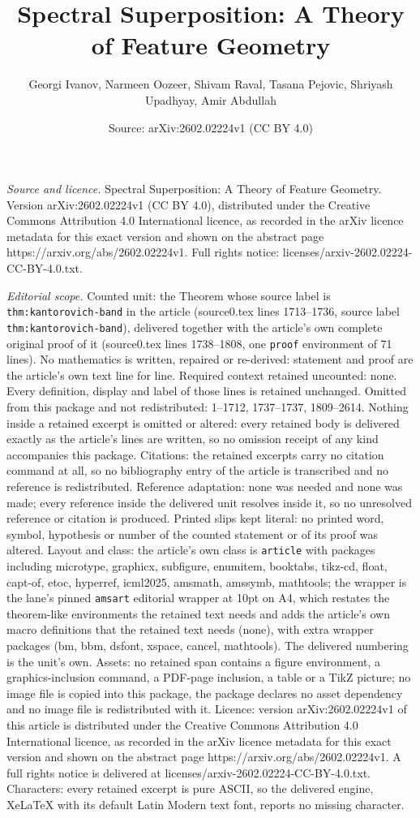\documentclass[10pt,a4paper]{amsart}
\title[Spectral Superposition: A Theory of Feature Geometry]{Spectral Superposition: A Theory of Feature Geometry}
\author{Georgi Ivanov, Narmeen Oozeer, Shivam Raval, Tasana Pejovic, Shriyash Upadhyay, Amir Abdullah}
\date{Source: arXiv:2602.02224v1 (CC BY 4.0)}
\begin{document}
\maketitle

\noindent\emph{Source and licence.} Spectral Superposition: A Theory of Feature Geometry. Version arXiv:2602.02224v1 (CC BY 4.0), distributed under the Creative Commons Attribution 4.0 International licence, as recorded in the arXiv licence metadata for this exact version and shown on the abstract page https://arxiv.org/abs/2602.02224v1. Full rights notice: licenses/arxiv-2602.02224-CC-BY-4.0.txt.\par\smallskip

\noindent\textit{Editorial scope.} Counted unit: the Theorem whose source label is \texttt{thm:kantorovich-band} in the article (source0.tex lines 1713--1736, source label \texttt{thm:kantorovich-band}), delivered together with the article's own complete original proof of it (source0.tex lines 1738--1808, one \texttt{proof} environment of 71 lines). No mathematics is written, repaired or re-derived: statement and proof are the article's own text line for line. Required context retained uncounted: none. Every definition, display and label of those lines is retained unchanged. Omitted from this package and not redistributed: 1--1712, 1737--1737, 1809--2614. Nothing inside a retained excerpt is omitted or altered: every retained body is delivered exactly as the article's lines are written, so no omission receipt of any kind accompanies this package. Citations: the retained excerpts carry no citation command at all, so no bibliography entry of the article is transcribed and no reference is redistributed. Reference adaptation: none was needed and none was made; every reference inside the delivered unit resolves inside it, so no unresolved reference or citation is produced. Printed slips kept literal: no printed word, symbol, hypothesis or number of the counted statement or of its proof was altered. Layout and class: the article's own class is \texttt{article} with packages including microtype, graphicx, subfigure, enumitem, booktabs, tikz-cd, float, capt-of, etoc, hyperref, icml2025, amsmath, amssymb, mathtools; the wrapper is the lane's pinned \texttt{amsart} editorial wrapper at 10pt on A4, which restates the theorem-like environments the retained text needs and adds the article's own macro definitions that the retained text needs (none), with extra wrapper packages (bm, bbm, dsfont, xspace, cancel, mathtools). The delivered numbering is the unit's own. Assets: no retained span contains a figure environment, a graphics-inclusion command, a PDF-page inclusion, a table or a TikZ picture; no image file is copied into this package, the package declares no asset dependency and no image file is redistributed with it. Licence: version arXiv:2602.02224v1 of this article is distributed under the Creative Commons Attribution 4.0 International licence, as recorded in the arXiv licence metadata for this exact version and shown on the abstract page https://arxiv.org/abs/2602.02224v1. A full rights notice is delivered at licenses/arxiv-2602.02224-CC-BY-4.0.txt. Characters: every retained excerpt is pure ASCII, so the delivered engine, XeLaTeX with its default Latin Modern text font, reports no missing character.
\end{document}
